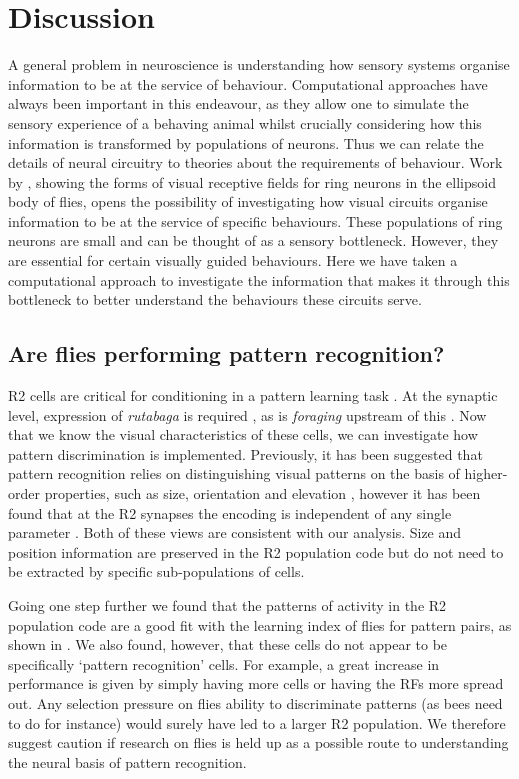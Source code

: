 \section{Discussion}
A general problem in neuroscience is understanding how sensory systems organise information to be at the service of behaviour. Computational approaches have always been important in this endeavour, as they allow one to simulate the sensory experience of a behaving animal whilst crucially considering how this information is transformed by populations of neurons. Thus we can relate the details of neural circuitry to theories about the requirements of behaviour.
Work by , showing the forms of visual receptive fields for ring neurons in the ellipsoid body of flies, opens the possibility of investigating how visual circuits organise information to be at the service of specific behaviours. These populations of ring neurons are small and can be thought of as a sensory bottleneck. However, they are essential for certain visually guided behaviours. Here we have taken a computational approach  to investigate the information that makes it through this bottleneck to better understand the behaviours these circuits serve.

\subsection{Are flies performing pattern recognition?}

R2 cells are critical for conditioning in a pattern learning task \cite{Pan2009}. At the synaptic level, expression of \emph{rutabaga} is required \cite{Pan2009}, as is \emph{foraging} upstream of this \cite{Wang2008}. Now that we know the visual characteristics of these cells, we can investigate how pattern discrimination is implemented. Previously, it has been suggested that pattern recognition relies on distinguishing visual patterns on the basis of higher-order properties, such as size, orientation and elevation \cite{Ernst1999,Pan2009}, however it has been found that at the R2 synapses the encoding is independent of any single parameter \cite{Liu2006}. Both of these views are consistent with our analysis. Size and position information are preserved in the R2 population code but do not need to be extracted by specific sub-populations of cells. 

Going one step further we found that the patterns of activity in the R2 population code are a good fit with the learning index of flies for pattern pairs, as shown in . We also found, however, that these cells do not appear to be specifically `pattern recognition' cells.
For example, a great increase in performance is given by simply having more cells or having the RFs more spread out. Any selection pressure on flies ability to discriminate patterns (as bees need to do for instance) would surely have led to a larger R2 population. We therefore suggest caution if research on flies is held up as a possible route to understanding the neural basis of pattern recognition.


